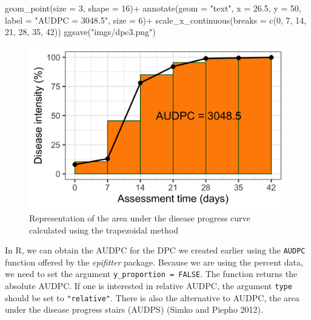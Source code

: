 \documentclass[
  letterpaper,
  DIV=11,
  numbers=noendperiod]{scrreprt}
\newenvironment{Shaded}{\begin{snugshade}}{\end{snugshade}}
\newcommand{\AttributeTok}[1]{\textcolor[rgb]{0.40,0.45,0.13}{#1}}
\newcommand{\DecValTok}[1]{\textcolor[rgb]{0.68,0.00,0.00}{#1}}
\newcommand{\FloatTok}[1]{\textcolor[rgb]{0.68,0.00,0.00}{#1}}
\newcommand{\FunctionTok}[1]{\textcolor[rgb]{0.28,0.35,0.67}{#1}}
\newcommand{\NormalTok}[1]{\textcolor[rgb]{0.00,0.23,0.31}{#1}}
\newcommand{\SpecialCharTok}[1]{\textcolor[rgb]{0.37,0.37,0.37}{#1}}
\newcommand{\StringTok}[1]{\textcolor[rgb]{0.13,0.47,0.30}{#1}}
\begin{document}
\begin{Shaded}
\begin{Highlighting}[]
  \FunctionTok{geom\_point}\NormalTok{(}\AttributeTok{size =} \DecValTok{3}\NormalTok{, }\AttributeTok{shape =} \DecValTok{16}\NormalTok{)}\SpecialCharTok{+}
  \FunctionTok{annotate}\NormalTok{(}\AttributeTok{geom =} \StringTok{"text"}\NormalTok{, }\AttributeTok{x =} \FloatTok{26.5}\NormalTok{, }\AttributeTok{y =} \DecValTok{50}\NormalTok{,}
           \AttributeTok{label =} \StringTok{"AUDPC = 3048.5"}\NormalTok{, }\AttributeTok{size =} \DecValTok{6}\NormalTok{)}\SpecialCharTok{+}
  \FunctionTok{scale\_x\_continuous}\NormalTok{(}\AttributeTok{breaks =} \FunctionTok{c}\NormalTok{(}\DecValTok{0}\NormalTok{, }\DecValTok{7}\NormalTok{, }\DecValTok{14}\NormalTok{, }\DecValTok{21}\NormalTok{, }\DecValTok{28}\NormalTok{, }\DecValTok{35}\NormalTok{, }\DecValTok{42}\NormalTok{))}
\FunctionTok{ggsave}\NormalTok{(}\StringTok{"imgs/dpc3.png"}\NormalTok{)}
\end{Highlighting}
\end{Shaded}

\begin{figure}

{\centering \includegraphics{imgs/dpc3.png}

}

\caption{\label{fig-dpc3}Representation of the area under the disease
progress curve calculated using the trapezoidal method}

\end{figure}

In R, we can obtain the AUDPC for the DPC we created earlier using the
\texttt{AUDPC} function offered by the \emph{epifitter} package. Because
we are using the percent data, we need to set the argument
\texttt{y\_proportion\ =\ FALSE}. The function returns the absolute
AUDPC. If one is interested in relative AUDPC, the argument
\texttt{type} should be set to \texttt{"relative"}. There is also the
alternative to AUDPC, the area under the disease progress stairs (AUDPS)
(Simko and Piepho 2012).
\end{document}
